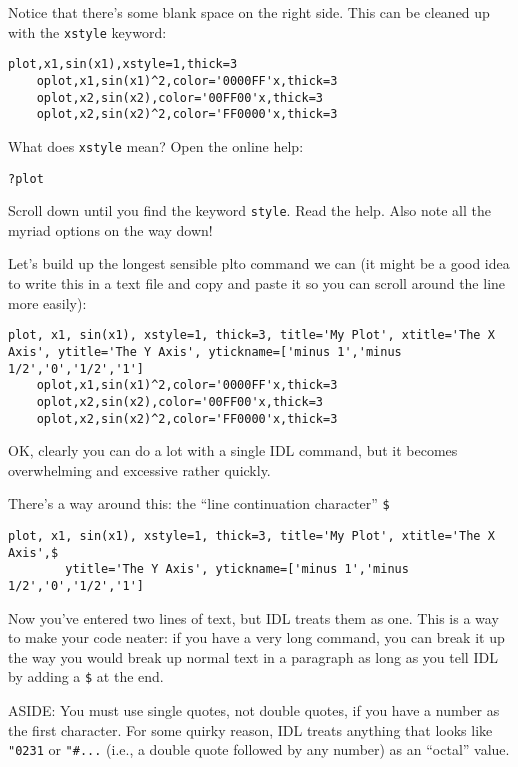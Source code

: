 \documentclass{article}
\begin{document}
\begin{spacing}{1.0}
Notice that there's some blank space on the right side.  This can be cleaned up with
the \verb|xstyle| keyword:

\begin{lstlisting}[breaklines,upquote=true]
    plot,x1,sin(x1),xstyle=1,thick=3
    oplot,x1,sin(x1)^2,color='0000FF'x,thick=3
    oplot,x2,sin(x2),color='00FF00'x,thick=3
    oplot,x2,sin(x2)^2,color='FF0000'x,thick=3
\end{lstlisting}

What does \verb|xstyle| mean?  Open the online help:

\verb|?plot|

Scroll down until you find the keyword \verb|style|.  Read the help.  Also note
all the myriad options on the way down!

Let's build up the longest sensible plto command we can (it might be a good
idea to write this in a text file and copy and paste it so you can scroll
around the line more easily):

\begin{lstlisting}[breaklines,upquote=true]
    plot, x1, sin(x1), xstyle=1, thick=3, title='My Plot', xtitle='The X Axis', ytitle='The Y Axis', ytickname=['minus 1','minus 1/2','0','1/2','1']
    oplot,x1,sin(x1)^2,color='0000FF'x,thick=3
    oplot,x2,sin(x2),color='00FF00'x,thick=3
    oplot,x2,sin(x2)^2,color='FF0000'x,thick=3
\end{lstlisting}

OK, clearly you can do a lot with a single IDL command, but it becomes
overwhelming and excessive rather quickly.

There's a way around this: the ``line continuation character'' \verb|$|

\begin{lstlisting}[breaklines,upquote=true]
    plot, x1, sin(x1), xstyle=1, thick=3, title='My Plot', xtitle='The X Axis',$
        ytitle='The Y Axis', ytickname=['minus 1','minus 1/2','0','1/2','1']
\end{lstlisting}

Now you've entered two lines of text, but IDL treats them as one.  This is a
way to make your code neater: if you have a very long command, you can break it
up the way you would break up normal text in a paragraph as long as you tell
IDL by adding a \verb|$| at the end.

ASIDE: You must use single quotes, not double quotes, if you have a number as
the first character.  For some quirky reason, IDL treats anything that looks like
\verb|"0231| or \verb|"#...| (i.e., a double quote followed by any number) as an
``octal'' value.


\end{spacing}
\end{document}
